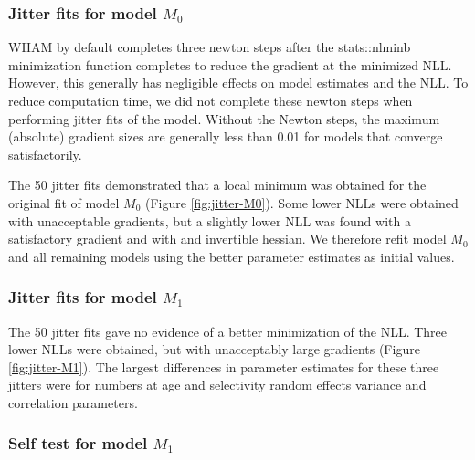 \documentclass[
]{article}
\begin{document}
\hypertarget{jitter-fits-for-model-m_0}{%
\subsubsection*{\texorpdfstring{Jitter fits for model
\(M_0\)}{Jitter fits for model M\_0}}\label{jitter-fits-for-model-m_0}}

WHAM by default completes three newton steps after the stats::nlminb
minimization function completes to reduce the gradient at the minimized
NLL. However, this generally has negligible effects on model estimates
and the NLL. To reduce computation time, we did not complete these
newton steps when performing jitter fits of the model. Without the
Newton steps, the maximum (absolute) gradient sizes are generally less
than 0.01 for models that converge satisfactorily.

The 50 jitter fits demonstrated that a local minimum was obtained for
the original fit of model \(M_0\) (Figure \ref{fig:jitter-M0}). Some
lower NLLs were obtained with unacceptable gradients, but a slightly
lower NLL was found with a satisfactory gradient and with and invertible
hessian. We therefore refit model \(M_0\) and all remaining models using
the better parameter estimates as initial values.

\hypertarget{jitter-fits-for-model-m_1}{%
\subsubsection*{\texorpdfstring{Jitter fits for model
\(M_1\)}{Jitter fits for model M\_1}}\label{jitter-fits-for-model-m_1}}

The 50 jitter fits gave no evidence of a better minimization of the NLL.
Three lower NLLs were obtained, but with unacceptably large gradients
(Figure \ref{fig:jitter-M1}). The largest differences in parameter
estimates for these three jitters were for numbers at age and
selectivity random effects variance and correlation parameters.

\hypertarget{self-test-for-model-m_1}{%
\subsubsection*{\texorpdfstring{Self test for model
\(M_1\)}{Self test for model M\_1}}\label{self-test-for-model-m_1}}
\end{document}
